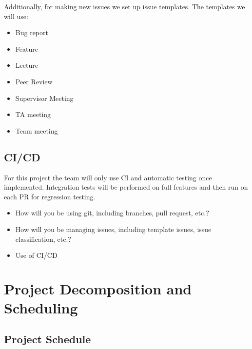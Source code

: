 \documentclass{article}
\begin{document}
Additionally, for making new issues we set up issue templates. The templates we will use:
\begin{itemize}
  \item Bug report
  \item Feature
  \item Lecture
  \item Peer Review 
  \item Supervisor Meeting
  \item TA meeting
  \item Team meeting
\end{itemize}

\subsection{CI/CD}

For this project the team will only use CI and automatic testing once implemented. 
Integration tests will be performed on full features and then run on each PR for regression testing. 

\begin{itemize}
	\item How will you be using git, including branches, pull request, etc.?
	\item How will you be managing issues, including template issues, issue
	classification, etc.?
  \item Use of CI/CD
\end{itemize}

\section{Project Decomposition and Scheduling}

\subsection{Project Schedule}
\end{document}
